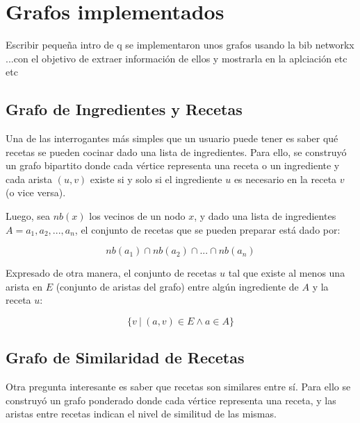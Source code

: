 \documentclass[a4paper]{article}
\newcommand{\todo}[1]{\color{red}#1\color{black}}
\begin{document}

\section{Grafos implementados}\label{sec:graphs}

\todo{Escribir pequeña intro de q se implementaron unos grafos usando la bib
networkx ...con el objetivo de extraer información de ellos y mostrarla en la
aplciación etc etc}

\subsection{Grafo de Ingredientes y Recetas}\label{sub:ing-recip-graph}

Una de las interrogantes más simples que un usuario puede tener es saber
qué recetas se pueden cocinar dado una lista de ingredientes. Para ello,
se construyó un grafo bipartito donde cada vértice representa una receta
o un ingrediente y cada arista $(u, v)$ existe si y solo si el ingrediente
$u$ es necesario en la receta $v$ (o vice versa).

Luego, sea $nb(x)$ los vecinos de un nodo $x$, y dado una lista de ingredientes
$A = a_1, a_2, ..., a_n$, el conjunto de recetas que se pueden preparar está dado
por:

$$ nb(a_1) \cap nb(a_2) \cap ... \cap nb(a_n)$$

Expresado de otra manera, el conjunto de recetas $u$ tal que existe al menos
una arista en $E$ (conjunto de aristas del grafo) entre algún ingrediente de
$A$ y la receta $u$:

$$ \{v ~|~ (a, v) \in E \wedge a \in A \} $$

\subsection{Grafo de Similaridad de Recetas}\label{sub:sim-rec-graph}

Otra pregunta interesante es saber que recetas son similares entre sí. Para
ello se construyó un grafo ponderado donde cada vértice representa una receta,
y las aristas entre recetas indican el nivel de similitud de las mismas.
\end{document}
